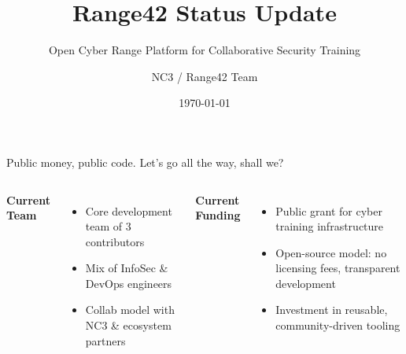 \documentclass[aspectratio=169]{beamer}
\title{\faIcon{shield-alt}\; Range42 Status Update}
\subtitle{Open Cyber Range Platform for Collaborative Security Training}
\author{NC3 / Range42 Team}
\date{\today}
\institute{\faServer\; Proxmox \quad \faCogs\; Ansible \quad \faProjectDiagram\; Orchestration \quad \faBinoculars\; Telemetry}
\begin{document}
\begin{frame}
  \titlepage
\end{frame}



\begin{frame}{Public money, public code. Let's go all the way, shall we?}
  \begin{columns}[T]
    \textbf{Current Team}
    \begin{itemize}
      \item Core development team of 3 contributors
      \item Mix of InfoSec \& DevOps engineers
      \item Collab model with NC3 \& ecosystem partners
    \end{itemize}
    
    \textbf{Current Funding}
    \begin{itemize}
      \item Public grant for cyber training infrastructure
      \item Open-source model: no licensing fees, transparent development
      \item Investment in reusable, community-driven tooling
    \end{itemize}
    

\end{columns}
\end{frame}
\end{document}

